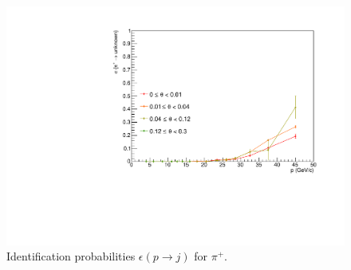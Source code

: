 \begin{figure}[!p]
  \includegraphics[scale=0.38]{./gfx/pip_u.pdf}
	\caption{Identification probabilities $\epsilon(p \rightarrow j)$ for $\pi^+$.}
	\label{pic:Effpip}
\end{figure}

